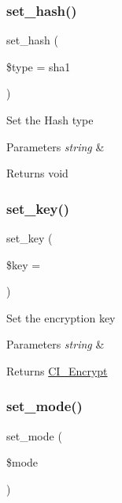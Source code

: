 \subsubsection{\texorpdfstring{set\+\_\+hash()}{set\_hash()}}
{\footnotesize\ttfamily set\+\_\+hash (\begin{DoxyParamCaption}\item[{}]{\$type = {\ttfamily \textquotesingle{}sha1\textquotesingle{}} }\end{DoxyParamCaption})}

Set the Hash type


\begin{DoxyParams}{Parameters}
{\em string} & \\
\hline
\end{DoxyParams}
\begin{DoxyReturn}{Returns}
void 
\end{DoxyReturn}
\mbox{\label{class_c_i___encrypt_ac8f224ccad805d0bcdf4ab7722058ae2}} 
\subsubsection{\texorpdfstring{set\+\_\+key()}{set\_key()}}
{\footnotesize\ttfamily set\+\_\+key (\begin{DoxyParamCaption}\item[{}]{\$key = {\ttfamily \textquotesingle{}\textquotesingle{}} }\end{DoxyParamCaption})}

Set the encryption key


\begin{DoxyParams}{Parameters}
{\em string} & \\
\hline
\end{DoxyParams}
\begin{DoxyReturn}{Returns}
\mbox{\hyperlink{class_c_i___encrypt}{C\+I\+\_\+\+Encrypt}} 
\end{DoxyReturn}
\mbox{\label{class_c_i___encrypt_ab32fd90a4ac2df4be1e56460d6f6daa3}} 
\subsubsection{\texorpdfstring{set\+\_\+mode()}{set\_mode()}}
{\footnotesize\ttfamily set\+\_\+mode (\begin{DoxyParamCaption}\item[{}]{\$mode }\end{DoxyParamCaption})}

